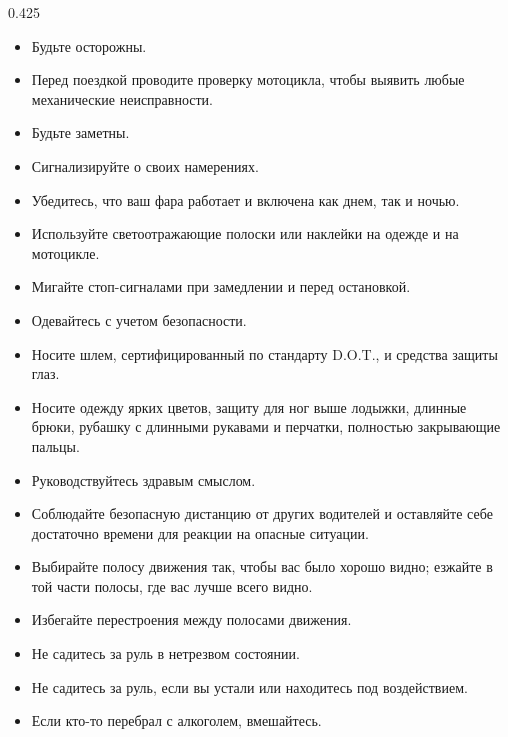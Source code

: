 \begin{langblock}{0.425}
\begin{rus}
\bigskip
\begin{itemize}[nosep]		
		\item Будьте осторожны.
		\item Перед поездкой проводите проверку мотоцикла, чтобы выявить любые механические неисправности.
\end{itemize}
\bigskip
\begin{itemize}[nosep]		
		
		\item Будьте заметны.
		\item Сигнализируйте о своих намерениях.
		\item Убедитесь, что ваш фара работает и включена как днем, так и ночью.
		\item Используйте светоотражающие полоски или наклейки на одежде и на мотоцикле.
		\item Мигайте стоп-сигналами при замедлении и перед остановкой.
		
	\end{itemize}
	\bigskip
	\begin{itemize}[nosep]
		
		\item Одевайтесь с учетом безопасности.
		\item Носите шлем, сертифицированный по стандарту D.O.T., и средства защиты глаз.
		\item Носите одежду ярких цветов, защиту для ног выше лодыжки, длинные брюки, рубашку с длинными рукавами и перчатки, полностью закрывающие пальцы.
		
	\end{itemize}
	\bigskip
	\begin{itemize}[nosep]
		\item Руководствуйтесь здравым смыслом.
		\item Соблюдайте безопасную дистанцию от других водителей и оставляйте себе достаточно времени для реакции на опасные ситуации.
		\item Выбирайте полосу движения так, чтобы вас было хорошо видно; езжайте в той части полосы, где вас лучше всего видно.
		\item Избегайте перестроения между полосами движения.
		
	\end{itemize}
	\bigskip
	\begin{itemize}[nosep]
		\item Не садитесь за руль в нетрезвом состоянии.
		\item Не садитесь за руль, если вы устали или находитесь под воздействием.
		\item Если кто-то перебрал с алкоголем, вмешайтесь.
		

\end{itemize}
\end{rus}
\end{langblock}
